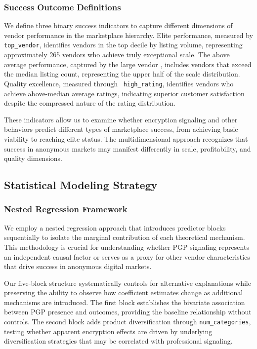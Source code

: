 \documentclass{article}
\begin{document}
\subsubsection{Success Outcome Definitions}

We define three binary success indicators to capture different dimensions of vendor performance in the marketplace hierarchy. Elite performance, measured by \texttt{ top_vendor}, identifies vendors in the top decile by listing volume, representing approximately 265 vendors who achieve truly exceptional scale. The above average performance, captured by the large vendor \texttt{}, includes vendors that exceed the median listing count, representing the upper half of the scale distribution. Quality excellence, measured through \texttt{ high_rating}, identifies vendors who achieve above-median average ratings, indicating superior customer satisfaction despite the compressed nature of the rating distribution.

These indicators allow us to examine whether encryption signaling and other behaviors predict different types of marketplace success, from achieving basic viability to reaching elite status. The multidimensional approach recognizes that success in anonymous markets may manifest differently in scale, profitability, and quality dimensions.

\subsection{Statistical Modeling Strategy}

\subsubsection{Nested Regression Framework}

We employ a nested regression approach that introduces predictor blocks sequentially to isolate the marginal contribution of each theoretical mechanism. This methodology is crucial for understanding whether PGP signaling represents an independent causal factor or serves as a proxy for other vendor characteristics that drive success in anonymous digital markets.

Our five-block structure systematically controls for alternative explanations while preserving the ability to observe how coefficient estimates change as additional mechanisms are introduced. The first block establishes the bivariate association between PGP presence and outcomes, providing the baseline relationship without controls. The second block adds product diversification through \texttt{num\_categories}, testing whether apparent encryption effects are driven by underlying diversification strategies that may be correlated with professional signaling.
\end{document}
